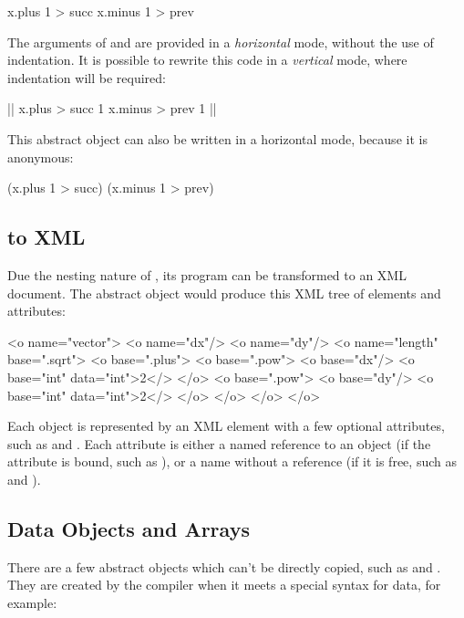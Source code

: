 \begin{ffcode}
[x]
  x.plus 1 > succ
  x.minus 1 > prev
\end{ffcode}

The arguments of  and  are provided in a \emph{horizontal}
mode, without the use of indentation. It is possible to rewrite this code
in a \emph{vertical} mode, where indentation will be required:

\begin{ffcode}
[x] |$\label{ln:succ}$|
  x.plus > succ
    1
  x.minus > prev
    1 |$\label{ln:succ-end}$|
\end{ffcode}

This abstract object can also be written in a horizontal mode,
because it is anonymous:

\begin{ffcode}
[x] (x.plus 1 > succ) (x.minus 1 > prev)
\end{ffcode}

\subsection{\eo{} to XML}\label{sec:xml}

Due the nesting nature of \eo{}, its program can be transformed
to an XML document. The abstract object  would produce
this XML tree of elements and attributes:

\begin{ffcode}
<o name="vector">
  <o name="dx"/>
  <o name="dy"/>
  <o name="length" base=".sqrt">
    <o base=".plus">
      <o base=".pow">
        <o base="dx"/>
        <o base="int" data="int">2</>
      </o>
      <o base=".pow">
        <o base="dy"/>
        <o base="int" data="int">2</>
      </o>
    </o>
  </o>
</o>
\end{ffcode}

Each object is represented by an  XML element with a few
optional attributes, such as  and . Each
attribute is either a named reference to an object (if the attribute is bound,
such as ), or a name without a reference (if it is free,
such as  and ).

\subsection{Data Objects and Arrays}

There are a few abstract objects which can't be directly copied, such as
 and . They are created by the compiler when it meets
a special syntax for data, for example:

